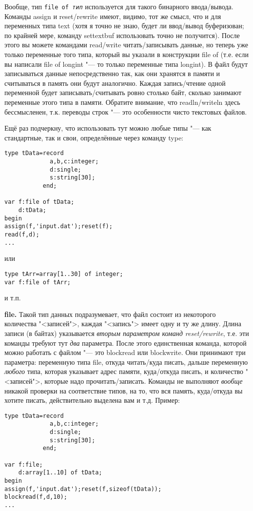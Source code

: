 Вообще, тип \texttt{file of \textit{тип}} используется для такого бинарного ввода/вывода. Команды 
assign и reset/\linebreak[0]rewrite имеют, видимо, тот же смысл, что и для переменных типа text (хотя я точно не 
знаю, будет ли ввод/вывод буферизован; по крайней мере, команду settextbuf использовать точно не 
получится). После этого вы можете командами read/write читать/записывать данные, но теперь уже 
только переменные того типа, который вы указали в конструкции file of (т.е. если вы написали file 
of longint "--- то только переменные типа longint). В файл будут записываться данные 
непосредственно так, как они хранятся в памяти и считываться в память они будут аналогично. Каждая 
запись/чтение одной переменной будет записывать/считывать ровно столько байт, сколько занимают 
переменные этого типа в памяти. Обратите внимание, что readln/writeln здесь бессмысленен, т.к. 
переводы строк "--- это особенности чисто текстовых файлов.

Ещё раз подчеркну, что использовать тут можно любые типы "--- как стандартные, так и свои, 
определённые через команду type:
\begin{codesample}\begin{verbatim}
type tData=record
             a,b,c:integer;
             d:single;
             s:string[30];
           end;
           
var f:file of tData;
    d:tData;
begin
assign(f,'input.dat');reset(f);
read(f,d);
...
\end{verbatim}\end{codesample}

или
\begin{codesampleo}\begin{verbatim}
type tArr=array[1..30] of integer;
var f:file of tArr;
\end{verbatim}\end{codesampleo}
и т.п.

\textbf{file.} Такой тип данных подразумевает, что файл состоит из некоторого количества 
"<записей">, каждая "<запись"> имеет одну и ту же длину. Длина записи (в байтах) указывается 
\textit{вторым параметром команд reset/rewrite}, т.е. эти команды требуют тут \textit{два} 
параметра. После этого единственная команда, которой можно работать с файлом "--- это blockread или 
blockwrite. Они принимают три параметра: переменную типа file, откуда читать/куда писать, дальше переменную 
\textit{любого} типа, которая указывает адрес памяти, куда/откуда писать, и количество "<записей">, которые 
надо прочитать/записать. Команды не выполняют \textit{вообще} никакой проверки на соответствие типов, на то, 
что вся память, куда/откуда вы хотите писать, действительно выделена вам и т.д. Пример:
\begin{codesample}\begin{verbatim}
type tData=record
             a,b,c:integer;
             d:single;
             s:string[30];
           end;
           
var f:file;
    d:array[1..10] of tData;
begin
assign(f,'input.dat');reset(f,sizeof(tData));
blockread(f,d,10);
...
\end{verbatim}\end{codesample}

